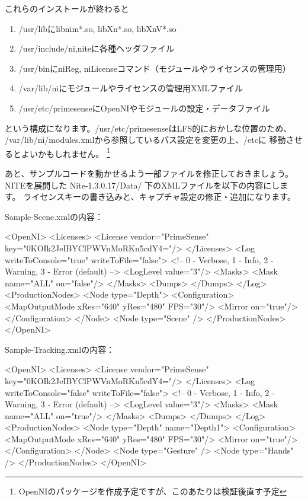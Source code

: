 \documentclass[mingoth,a4paper]{jsarticle}
\begin{document}
これらのインストールが終わると
\begin{enumerate}
\item /usr/libにlibnim*.so, libXn*.so, libXnV*.so
\item /usr/include/{ni,nite}に各種ヘッダファイル
\item /usr/binにniReg, niLicenseコマンド（モジュールやライセンスの管理用）
\item /var/lib/niにモジュールやライセンスの管理用XMLファイル
\item /usr/etc/primesenseにOpenNIやモジュールの設定・データファイル
\end{enumerate}
という構成になります。/usr/etc/primesenseはLFS的におかしな位置のため、
/var/lib/ni/modules.xmlから参照しているパス設定を変更の上、/etcに
移動させるとよいかもしれません。
\footnote{OpenNIのパッケージを作成予定ですが、このあたりは検証後直す予定}

あと、サンプルコードを動かせるよう一部ファイルを修正しておきましょう。
NITEを展開した Nite-1.3.0.17/Data/ 下のXMLファイルを以下の内容にします。
ライセンスキーの書き込みと、キャプチャ設定の修正・追加になります。

Sample-Scene.xmlの内容：
\begin{commandline}
<OpenNI>
  <Licenses>
    <License vendor="PrimeSense" key="0KOIk2JeIBYClPWVnMoRKn5cdY4="/>
  </Licenses>
  <Log writeToConsole="true" writeToFile="false">
    <!-- 0 - Verbose, 1 - Info, 2 - Warning, 3 - Error (default) -->
    <LogLevel value="3"/>
    <Masks>
    <Mask name="ALL" on="false"/>
    </Masks>
    <Dumps>
    </Dumps>
  </Log>
  <ProductionNodes>
    <Node type="Depth">
      <Configuration>
        <MapOutputMode xRes="640" yRes="480" FPS="30"/>
        <Mirror on="true"/>
      </Configuration>
    </Node>
    <Node type="Scene" />
  </ProductionNodes>
</OpenNI>
\end{commandline}

Sample-Tracking.xmlの内容：
\begin{commandline}
<OpenNI>
  <Licenses>
    <License vendor="PrimeSense" key="0KOIk2JeIBYClPWVnMoRKn5cdY4="/>
  </Licenses>
  <Log writeToConsole="false" writeToFile="false">
    <!-- 0 - Verbose, 1 - Info, 2 - Warning, 3 - Error (default) -->
    <LogLevel value="3"/>
    <Masks>
    <Mask name="ALL" on="true"/>
    </Masks>
    <Dumps>
    </Dumps>
  </Log>
  <ProductionNodes>
    <Node type="Depth" name="Depth1">
      <Configuration>
      <MapOutputMode xRes="640" yRes="480" FPS="30"/>
      <Mirror on="true"/>
      </Configuration>
    </Node>
    <Node type="Gesture" />
    <Node type="Hands" />
  </ProductionNodes>
</OpenNI>
\end{commandline}
\end{document}
